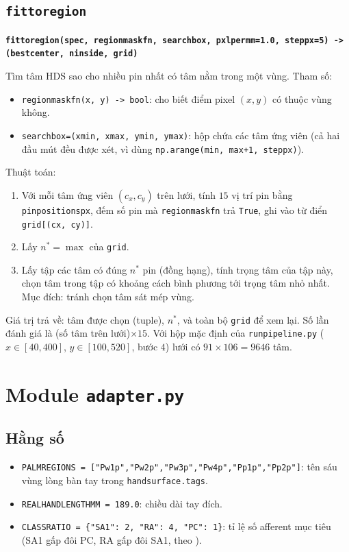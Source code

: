 \documentclass[11pt,a4paper]{article}
\renewcommand{\_}{\textunderscore\hspace{0pt}}
\newcommand{\code}[1]{\texttt{#1}}
\newcommand{\sig}[1]{\par\smallskip\noindent\textbf{\texttt{#1}}\par\nopagebreak}
\begin{document}
\subsection{\texttt{fit\_to\_region}}
\sig{fit\_to\_region(spec, region\_mask\_fn, search\_box, pxl\_per\_mm=1.0, step\_px=5) -> (best\_center, n\_inside, grid)}
Tìm tâm HDS sao cho nhiều pin nhất có tâm nằm trong một vùng. Tham số:
\begin{itemize}
\item \code{region\_mask\_fn(x, y) -> bool}: cho biết điểm pixel $(x,y)$ có thuộc vùng không.
\item \code{search\_box=(xmin, xmax, ymin, ymax)}: hộp chứa các tâm ứng viên (cả hai đầu mút đều được xét, vì dùng \code{np.arange(min, max+1, step\_px)}).
\end{itemize}
Thuật toán:
\begin{enumerate}
\item Với mỗi tâm ứng viên $(c_x,c_y)$ trên lưới, tính $15$ vị trí pin bằng \code{pin\_positions\_px}, đếm số pin mà \code{region\_mask\_fn} trả \code{True}, ghi vào từ điển \code{grid[(cx, cy)]}.
\item Lấy $n^*=\max$ của \code{grid}.
\item Lấy tập các tâm có đúng $n^*$ pin (đồng hạng), tính trọng tâm của tập này, chọn tâm trong tập có khoảng cách bình phương tới trọng tâm nhỏ nhất. Mục đích: tránh chọn tâm sát mép vùng.
\end{enumerate}
Giá trị trả về: tâm được chọn (tuple), $n^*$, và toàn bộ \code{grid} để xem lại. Số lần đánh giá là (số tâm trên lưới)$\times15$. Với hộp mặc định của \code{run\_pipeline.py} ($x\in[40,400]$, $y\in[100,520]$, bước $4$) lưới có $91\times106=9646$ tâm.

\section{Module \texttt{adapter.py}}

\subsection{Hằng số}
\begin{itemize}
\item \code{PALM\_REGIONS = ["Pw1\_p","Pw2\_p","Pw3\_p","Pw4\_p","Pp1\_p","Pp2\_p"]}: tên sáu vùng lòng bàn tay trong \code{hand\_surface.tags}.
\item \code{REAL\_HAND\_LENGTH\_MM = 189.0}: chiều dài tay đích.
\item \code{CLASS\_RATIO = \{"SA1": 2, "RA": 4, "PC": 1\}}: tỉ lệ số afferent mục tiêu (SA1 gấp đôi PC, RA gấp đôi SA1, theo \cite{saal2017}).
\end{itemize}
\end{document}
